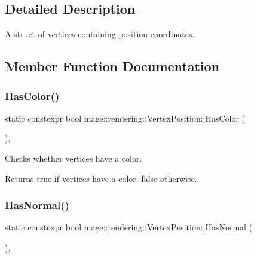 \subsection{Detailed Description}
A struct of vertices containing position coordinates. 

\subsection{Member Function Documentation}
\mbox{\label{structmage_1_1rendering_1_1_vertex_position_afe87ed5fda84b4acc17a94a07d389ff7}} 
\subsubsection{\texorpdfstring{Has\+Color()}{HasColor()}}
{\footnotesize\ttfamily static constexpr bool mage\+::rendering\+::\+Vertex\+Position\+::\+Has\+Color (\begin{DoxyParamCaption}{ }\end{DoxyParamCaption})\hspace{0.3cm}{\ttfamily [static]}, {\ttfamily [noexcept]}}

Checks whether vertices have a color.

\begin{DoxyReturn}{Returns}
{\ttfamily true} if vertices have a color. {\ttfamily false} otherwise. 
\end{DoxyReturn}
\mbox{\label{structmage_1_1rendering_1_1_vertex_position_abf33917c1c93dfcffd25c146b53189e8}} 
\subsubsection{\texorpdfstring{Has\+Normal()}{HasNormal()}}
{\footnotesize\ttfamily static constexpr bool mage\+::rendering\+::\+Vertex\+Position\+::\+Has\+Normal (\begin{DoxyParamCaption}{ }\end{DoxyParamCaption})\hspace{0.3cm}{\ttfamily [static]}, {\ttfamily [noexcept]}}

